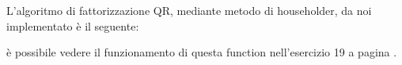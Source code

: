 \begin{flushleft}
L'algoritmo di fattorizzazione QR, mediante metodo di householder, da noi implementato è il seguente:

è possibile vedere il funzionamento di questa function nell'esercizio 19 a pagina \pageref{es319}.
\end{flushleft}